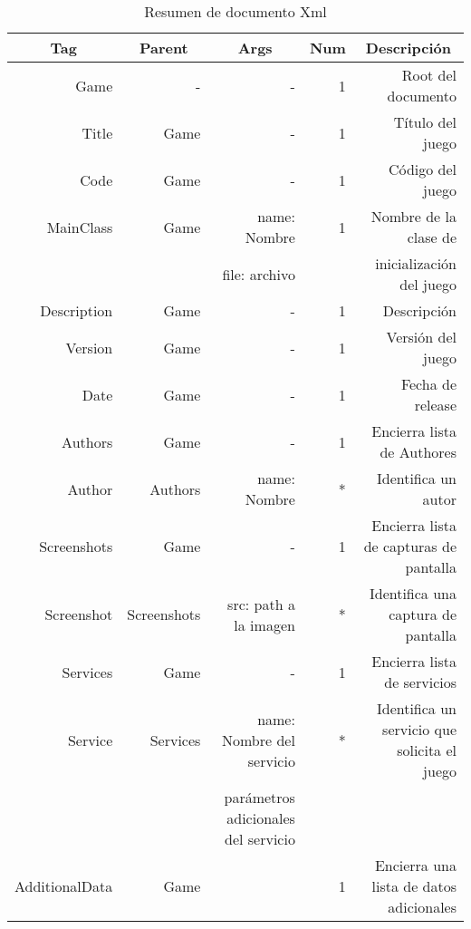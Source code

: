 \begin{table}[htbp]
  \centering
  \caption{Resumen de documento Xml}
    \begin{tabular}{rrrrr}
    \toprule
    \multicolumn{1}{c}{\textbf{Tag}} & \multicolumn{1}{c}{\textbf{Parent}} & \multicolumn{1}{c}{\textbf{Args}} & \multicolumn{1}{c}{\textbf{Num}} & \multicolumn{1}{c}{\textbf{Descripción}} \\
    \midrule
    Game  & -     & -     & 1     & Root del documento \\
    Title & Game  & -     & 1     & Título del juego \\
    Code  & Game  & -     & 1     & Código del juego \\
    MainClass & Game  & name: Nombre & 1     & Nombre de la clase de  \\
          &       & file: archivo &       & inicialización del juego \\
    Description & Game  & -     & 1     & Descripción \\
    Version & Game  & -     & 1     & Versión del juego \\
    Date  & Game  & -     & 1     & Fecha de release \\
    Authors & Game  & -     & 1     & Encierra lista de Authores \\
    Author & Authors & name: Nombre & *     & Identifica un autor \\
    Screenshots & Game  & -     & 1     & Encierra lista de capturas de pantalla \\
    Screenshot & Screenshots & src: path a la imagen & *     & Identifica una captura de pantalla \\
    Services & Game  & -     & 1     & Encierra lista de servicios \\
    Service & Services & name: Nombre del servicio & *     & Identifica un servicio que solicita el juego \\
          &       & parámetros adicionales del servicio &       &  \\
    AdditionalData & Game  &       & 1     & Encierra una lista de datos adicionales \\
    \bottomrule
    \end{tabular}%
  \label{tab:tablaxmll}%
\end{table}%
